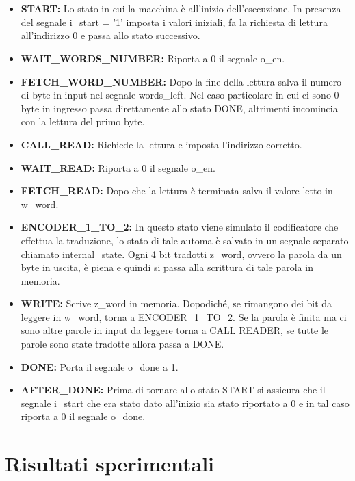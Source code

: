 \documentclass{article}
\begin{document}
\\
\\
\begin{itemize}
	\item \textbf{START:} Lo stato in cui la macchina è all'inizio dell'esecuzione. In presenza del segnale i\_start = '1' imposta i valori iniziali, fa la richiesta di lettura all'indirizzo 0 e passa allo stato successivo.
	\item \textbf{WAIT\_WORDS\_NUMBER:} Riporta a 0 il segnale o\_en.
	\item \textbf{FETCH\_WORD\_NUMBER:} Dopo la fine della lettura salva il numero di byte in input nel segnale words\_left. Nel caso particolare in cui ci sono 0 byte in ingresso passa direttamente allo stato DONE, altrimenti incomincia con la lettura del primo byte.
	\item \textbf{CALL\_READ:} Richiede la lettura e imposta l'indirizzo corretto.
	\item \textbf{WAIT\_READ:} Riporta a 0 il segnale o\_en.
	\item \textbf{FETCH\_READ:} Dopo che la lettura è terminata salva il valore letto in w\_word.
	\item \textbf{ENCODER\_1\_TO\_2:} In questo stato viene simulato il codificatore che effettua la traduzione, lo stato di tale automa è salvato in un segnale separato chiamato internal\_state. Ogni 4 bit tradotti z\_word, ovvero la parola da un byte in uscita, è piena e quindi si passa alla scrittura di tale parola in memoria.
	\item \textbf{WRITE:} Scrive z\_word in memoria. Dopodiché, se rimangono dei bit da leggere in w\_word, torna a ENCODER\_1\_TO\_2. Se la parola è finita ma ci sono altre parole in input da leggere torna a CALL READER, se tutte le parole sono state tradotte allora passa a DONE.
	\item \textbf{DONE:} Porta il segnale o\_done a 1.
	\item \textbf{AFTER\_DONE:} Prima di tornare allo stato START si assicura che il segnale i\_start che era stato dato all'inizio sia stato riportato a 0 e in tal caso riporta a 0 il segnale o\_done.
\end{itemize}
\pagebreak

\section{Risultati sperimentali}
\end{document}
